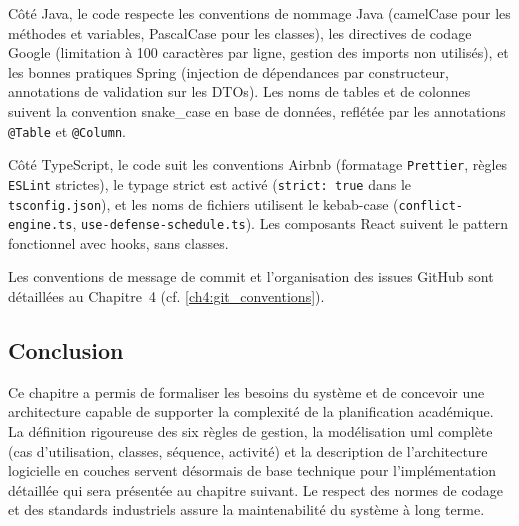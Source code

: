 Côté Java, le code respecte les conventions de nommage Java (camelCase pour les méthodes et variables, PascalCase pour les classes), les directives de codage Google (limitation à 100 caractères par ligne, gestion des imports non utilisés), et les bonnes pratiques Spring (injection de dépendances par constructeur, annotations de validation sur les DTOs). Les noms de tables et de colonnes suivent la convention snake\_case en base de données, reflétée par les annotations \texttt{@Table} et \texttt{@Column}.

Côté TypeScript, le code suit les conventions Airbnb (formatage \texttt{Prettier}, règles \texttt{ESLint} strictes), le typage strict est activé (\texttt{strict: true} dans le \texttt{tsconfig.json}), et les noms de fichiers utilisent le kebab-case (\texttt{conflict-engine.ts}, \texttt{use-defense-schedule.ts}). Les composants React suivent le pattern fonctionnel avec hooks, sans classes.

Les conventions de message de commit et l'organisation des issues GitHub sont détaillées au Chapitre~4 (cf. \cref{ch4:git_conventions}).

\subsection{Conclusion}
\label{ch3:conclusion}

Ce chapitre a permis de formaliser les besoins du système et de concevoir une architecture capable de supporter la complexité de la planification académique. La définition rigoureuse des six règles de gestion, la modélisation \acrshort{uml} complète (cas d'utilisation, classes, séquence, activité) et la description de l'architecture logicielle en couches servent désormais de base technique pour l'implémentation détaillée qui sera présentée au chapitre suivant. Le respect des normes de codage et des standards industriels assure la maintenabilité du système à long terme.
